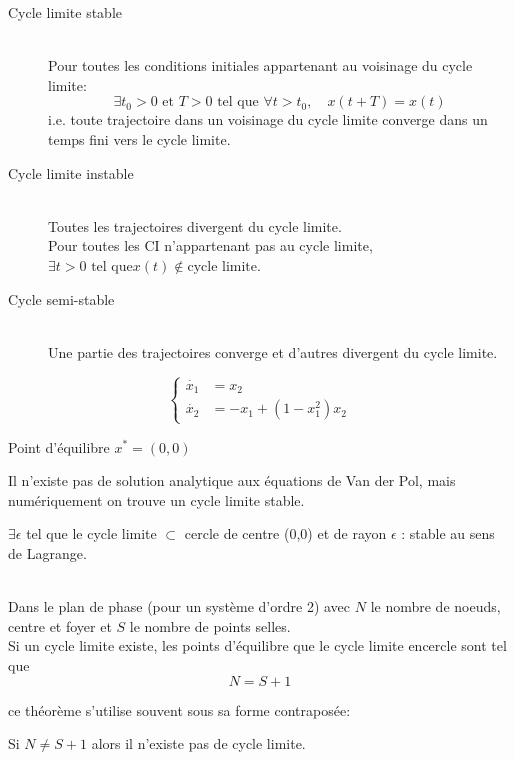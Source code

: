 \documentclass[main.tex]{subfiles}
\begin{document}
\begin{prop}
  \begin{description}
  \item[Cycle limite stable]~\\
Pour toutes les conditions initiales appartenant au voisinage du cycle limite:
\[\exists t_0 > 0 \text{ et }T > 0 \text{ tel que } \forall t>t_0, \quad x(t+T) = x(t)\]
i.e. toute trajectoire dans un voisinage du cycle limite converge dans un temps fini vers le cycle limite.
\item[Cycle limite instable]~\\
Toutes les trajectoires divergent du cycle limite.\\
Pour toutes les CI n'appartenant pas au cycle limite, $ \exists t > 0 \text{ tel que} x(t) \notin \text{cycle limite} $.

\item[Cycle semi-stable]~\\
 Une partie des trajectoires converge et d'autres divergent du cycle limite.
\end{description}
\end{prop}


\begin{example}
\[
  \begin{cases}
\dot{x_1} & = x_2\\ \dot{x_2} & = -x_1 + (1-x_ 1^2)x_2
\end{cases}
\]

Point d'équilibre $x^* =(0,0)$
\begin{rem}
Il n'existe pas de solution analytique aux équations de Van der Pol, mais numériquement on trouve un cycle limite stable.
\end{rem}


$\exists \epsilon$ tel que le cycle limite $\subset$ cercle de centre (0,0) et de rayon $\epsilon$ : stable au sens de Lagrange.\\

\end{example}

\begin{thm}~\\
  Dans le plan de phase (pour un système d'ordre 2) avec $N$ le nombre de noeuds, centre et foyer et $S$ le nombre de points selles.\\
  Si un cycle limite existe, les points d'équilibre que le cycle limite encercle sont tel que
  \[
\boxed{N =S +1}
  \]
\end{thm}
ce théorème s'utilise souvent sous sa forme contraposée:
\begin{corol}
  Si $N\neq S+1$ alors il n'existe pas de cycle limite.
\end{corol}
\end{document}
